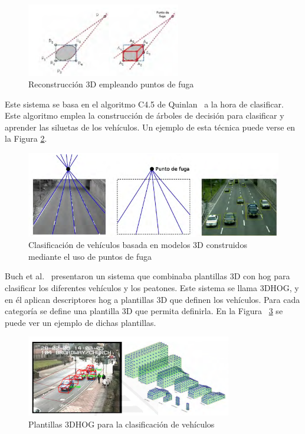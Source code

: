 \begin{figure}[H]
  \begin{center}
    \includegraphics[width=0.6\textwidth]{figures/Estado_arte/3d_puntos_fuga.png}
		\caption{Reconstrucción 3D empleando puntos de fuga}
		\label{fig.3d_fuga}
		\end{center}
\end{figure}

Este sistema se basa en el algoritmo C4.5 de Quinlan~\cite{c4_5} a la hora de clasificar. Este algoritmo emplea la construcción de árboles de decisión para clasificar y aprender las siluetas de los vehículos. Un ejemplo de esta técnica puede verse en la Figura \ref{fig.c4_5}.

\begin{figure}[H]
  \begin{center}
    \includegraphics[width=1\textwidth]{figures/Estado_arte/c4_5.png}
		\caption{Clasificación de vehículos basada en modelos 3D construidos mediante el uso de puntos de fuga}
		\label{fig.c4_5}
		\end{center}
\end{figure}

Buch et al.~\cite{3dhog_article} presentaron un sistema que combinaba plantillas 3D con \acrshort{hog} para clasificar los diferentes vehículos y los peatones. Este sistema se llama 3DHOG, y en él aplican descriptores \acrshort{hog} a plantillas 3D que definen los vehículos. Para cada categoría se define una plantilla 3D que permita definirla. En la Figura ~\ref{fig.3dhog} se puede ver un ejemplo de dichas plantillas.

\begin{figure}[H]
  \begin{center}
    \includegraphics[width=0.8\textwidth]{figures/Estado_arte/3dhog.png}
		\caption{Plantillas 3DHOG para la clasificación de vehículos}
		\label{fig.3dhog}
		\end{center}
\end{figure}

